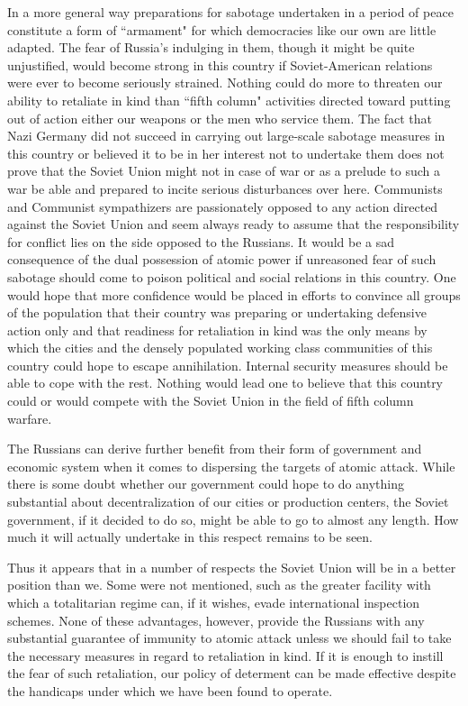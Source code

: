 In a more general way preparations for sabotage undertaken in a period of peace constitute a form of ``armament" for which democracies like our own are little adapted. The fear of Russia's indulging in them, though it might be quite unjustified, would become strong in this country if Soviet-American relations were ever to become seriously strained. Nothing could do more to threaten our ability to retaliate in kind than ``fifth column" activities directed toward putting out of action either our weapons or the men who service them. The fact that Nazi Germany did not succeed in carrying out large-scale sabotage measures in this country or believed it to be in her interest not to undertake them does not prove that the Soviet Union might not in case of war or as a prelude to such a war be able and prepared to incite serious disturbances over here. Communists and Communist sympathizers are passionately opposed to any action directed against the Soviet Union and seem always ready to assume that the responsibility for conflict lies on the side opposed to the Russians. It would be a sad consequence of the dual possession of atomic power if unreasoned fear of such sabotage should come to poison political and social relations in this country. One would hope that more confidence would be placed in efforts to convince all groups of the population that their country was preparing or undertaking defensive action only and that readiness for retaliation in kind was the only means by which the cities and the densely populated working class communities of this country could hope to escape annihilation. Internal security measures should be able to cope with the rest. Nothing would lead one to believe that this country could or would compete with the Soviet Union in the field of fifth column warfare.

The Russians can derive further benefit from their form of government and economic system when it comes to dispersing the targets of atomic attack. While there is some doubt whether our government could hope to do anything substantial about decentralization of our cities or production centers, the Soviet government, if it decided to do so, might be able to go to almost any length. How much it will actually undertake in this respect remains to be seen.

Thus it appears that in a number of respects the Soviet Union will be in a better position than we. Some were not mentioned, such as the greater facility with which a totalitarian regime can, if it wishes, evade international inspection schemes. None of these advantages, however, provide the Russians with any substantial guarantee of immunity to atomic attack unless we should fail to take the necessary measures in regard to retaliation in kind. If it is enough to instill the fear of such retaliation, our policy of determent can be made effective despite the handicaps under which we have been found to operate.

